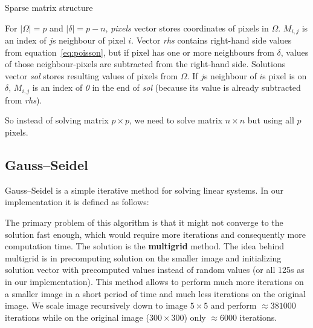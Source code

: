 \documentclass[hidelinks, english]{report}
\begin{document}
\begin{table*}[t]
    \caption{Sparse matrix structure}
    \label{tbl:sparse}
\end{table*}

For $ |\Omega| = p $ and $ |\delta| = p-n $, \textit{pixels} vector stores coordinates of pixels in $\Omega$. $M_{i,j}$
is an index of $j$s neighbour of pixel $i$. Vector \textit{rhs} contains right-hand side values from
equation~\eqref{eq:poisson}, but if pixel has one or more neighbours from $\delta$, values of those neighbour-pixels are
subtracted from the right-hand side. Solutions vector \textit{sol} stores resulting values of pixels from $\Omega$. If
$j$s neighbour of $i$s pixel is on $\delta$, $M_{i,j}$ is an index of \textit{0} in the end of \textit{sol} (because its
value is already subtracted from \textit{rhs}).

So instead of solving matrix $p \times p$, we need to solve matrix $n \times n$ but using all $p$ pixels.

\subsection{Gauss–Seidel}
Gauss–Seidel is a simple iterative method for solving linear systems. In our implementation it is defined as
follows:


The primary problem of this algorithm is that it might not converge to the solution fast enough, which would require
more iterations and consequently more computation time. The solution is the \textbf{multigrid} method. The idea behind
multigrid is in precomputing solution on the smaller image and initializing solution vector with precomputed values
instead of random values (or all 125s as in our implementation). This method allows to perform much more iterations on
a smaller image in a short period of time and much less iterations on the original image. We scale image recursively
down to image $5 \times 5$ and perform $\approx 381000$ iterations while on the original image ($300 \times 300$) only
$\approx 6000$ iterations.


\end{document}
